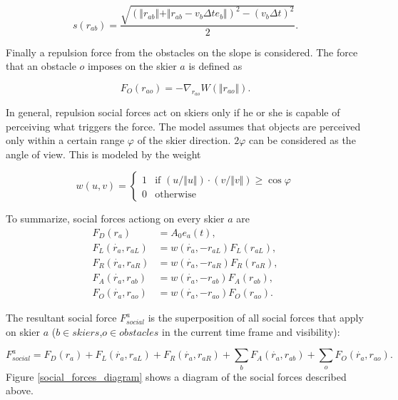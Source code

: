 \documentclass[12pt,a4paper,twoside]{book}
\begin{document}
\begin{equation}\label{skier_s}
s(r_{ab})=\frac{\sqrt{(\Vert r_{ab} \Vert + \Vert r_{ab}-v_b \Delta t e_b \Vert )^2-(v_b \Delta t)^2}}{2}.
\end{equation}

Finally a repulsion force from the obstacles on the slope is considered. The force that an obstacle $o$ imposes on the skier $a$ is defined as

\begin{equation}\label{obstacle_force}
F_O(r_{ao})=-\nabla_{r_{ao}}W(\Vert r_{ao} \Vert ).
\end{equation}

In general, repulsion social forces act on skiers only if he or she is capable of perceiving what triggers the force. The model assumes that objects are perceived only within a certain range $\varphi$ of the skier direction. $2\varphi$ can be considered as the angle of view. This is modeled by the weight

\begin{equation}\label{visibility}
w(u,v)=\begin{cases}
  1 & \text{if $(u/\Vert u \Vert)\cdot (v/\Vert v \Vert) \geq \cos \varphi$} \\
  0 & \text{otherwise }
  \end{cases}
\end{equation}

To summarize, social forces actiong on every skier $a$ are
\begin{align}\label{social_forces_tb}
F_D(r_a)&=A_0 e_a(t),\\
F_L(\dot{r_a},r_{aL})&=w(\dot{r_a},-r_{aL})F_L(r_{aL}),\\
F_R(\dot{r_a},r_{aR})&=w(\dot{r_a},-r_{aR})F_R(r_{aR}),\\
F_A(\dot{r_a},r_{ab})&=w(\dot{r_a},-r_{ab})F_A(r_{ab}),\\
F_O(\dot{r_a},r_{ao})&=w(\dot{r_a},-r_{ao})F_O(r_{ao}).
\end{align}

The resultant social force $F^a_{social}$ is the superposition of all social forces that apply on skier $a$ ($b\in skiers$,$o\in obstacles$ in the current time frame and visibility):

\begin{equation}
F^a_{social}=F_D(r_a)+F_L(\dot{r_a},r_{aL})+F_R(\dot{r_a},r_{aR})+\sum_b F_A(\dot{r_a},r_{ab})+\sum_o F_O(\dot{r_a},r_{ao}).\nonumber
\end{equation}
Figure \ref{social_forces_diagram} shows a diagram of the social forces described above.
\end{document}
